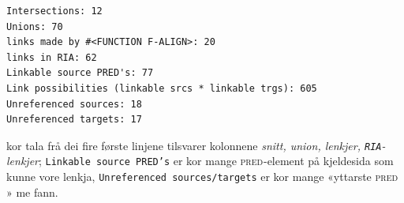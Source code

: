 \documentclass[12pt,a4paper,oneside,draft]{report}
\newcommand{\F}[2]{\textsc{#1}\ensuremath{_{#2}}}
\newcommand{\PRED}{\F{pred}{}}
\begin{document}
\begin{verbatim}
Intersections: 12
Unions: 70
links made by #<FUNCTION F-ALIGN>: 20
links in RIA: 62
Linkable source PRED's: 77
Link possibilities (linkable srcs * linkable trgs): 605
Unreferenced sources: 18
Unreferenced targets: 17
\end{verbatim}



kor tala frå dei fire første linjene tilsvarer kolonnene \emph{snitt,
 union, lenkjer, \texttt{RIA}-lenkjer}; \texttt{Linkable source PRED's} er
 kor mange \PRED{}-element på kjeldesida som kunne vore lenkja,
 \texttt{Unreferenced sources/targets} er kor mange «yttarste \PRED{}» me
 fann.
\end{document}
